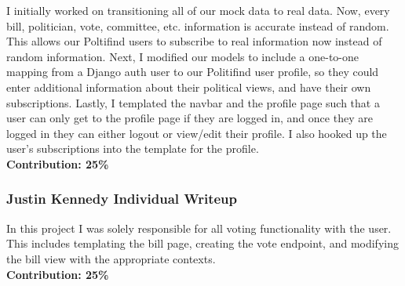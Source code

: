 \documentclass{article}
\newcommand{\n}{\noindent}
\begin{document}
I initially worked on transitioning all of our mock data to real data. Now, every bill, politician, vote, committee, etc. information is accurate instead of random. This allows our Poltifind users to subscribe to real information now instead of random information. Next, I modified our models to include a one-to-one mapping from a Django auth user to our Politifind user profile, so they could enter additional information about their political views, and have their own subscriptions. Lastly, I templated the navbar and the profile page such that a user can only get to the profile page if they are logged in, and once they are logged in they can either logout or view/edit their profile. I also hooked up the user's subscriptions into the template for the profile.\\

\n\textbf{Contribution: 25\%}

\pagebreak

\subsubsection*{Justin Kennedy Individual Writeup}

In this project I was solely responsible for all voting functionality with the user.  This includes templating the bill page, creating the vote endpoint, and modifying the bill view with the appropriate contexts.\\

\n\textbf{Contribution: 25\%}
\end{document}
